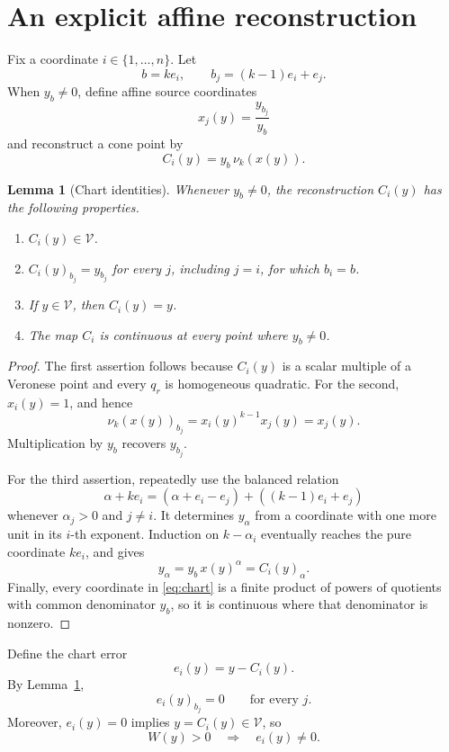 \documentclass[11pt]{article}
\newtheorem{lemma}[theorem]{Lemma}
\theoremstyle{definition}
\theoremstyle{remark}
\newcommand{\V}{\mathcal V}
\begin{document}
\section{An explicit affine reconstruction}

Fix a coordinate \(i\in\{1,\dots,n\}\).  Let
\[
  b=ke_i,\qquad
  b_j=(k-1)e_i+e_j.
\]
When \(y_b\neq0\), define affine source coordinates
\[
  x_j(y)=\frac{y_{b_j}}{y_b}
\]
and reconstruct a cone point by
\[
  C_i(y)=y_b\,\nu_k(x(y)).
  \tag{1}\label{eq:chart}
\]

\begin{lemma}[Chart identities]\label{lem:chart}
Whenever \(y_b\neq0\), the reconstruction \(C_i(y)\) has the following
properties.
\begin{enumerate}
\item \(C_i(y)\in\V\).
\item \(C_i(y)_{b_j}=y_{b_j}\) for every \(j\), including \(j=i\),
      for which \(b_i=b\).
\item If \(y\in\V\), then \(C_i(y)=y\).
\item The map \(C_i\) is continuous at every point where \(y_b\neq0\).
\end{enumerate}
\end{lemma}

\begin{proof}
The first assertion follows because \(C_i(y)\) is a scalar multiple of
a Veronese point and every \(q_r\) is homogeneous quadratic.  For the
second, \(x_i(y)=1\), and hence
\[
  \nu_k(x(y))_{b_j}=x_i(y)^{k-1}x_j(y)=x_j(y).
\]
Multiplication by \(y_b\) recovers \(y_{b_j}\).

For the third assertion, repeatedly use the balanced relation
\[
  \alpha+ke_i
   =(\alpha+e_i-e_j)+((k-1)e_i+e_j)
  \tag{2}\label{eq:transfer}
\]
whenever \(\alpha_j>0\) and \(j\neq i\).  It determines \(y_\alpha\)
from a coordinate with one more unit in its \(i\)-th exponent.  Induction
on \(k-\alpha_i\) eventually reaches the pure coordinate \(ke_i\), and
gives
\[
  y_\alpha=y_b\,x(y)^\alpha=C_i(y)_\alpha.
\]
Finally, every coordinate in \eqref{eq:chart} is a finite product of
powers of quotients with common denominator \(y_b\), so it is continuous
where that denominator is nonzero.
\end{proof}

Define the chart error
\[
  e_i(y)=y-C_i(y).
\]
By Lemma~\ref{lem:chart},
\[
  e_i(y)_{b_j}=0\qquad\text{for every }j.
  \tag{3}\label{eq:gauge}
\]
Moreover, \(e_i(y)=0\) implies \(y=C_i(y)\in\V\), so
\[
  W(y)>0\quad\Longrightarrow\quad e_i(y)\neq0.
  \tag{4}\label{eq:error-nonzero}
\]
\end{document}
